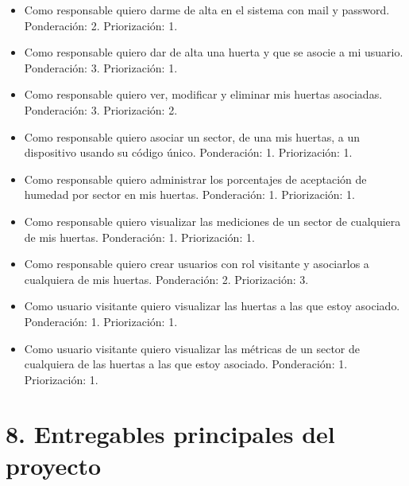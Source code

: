 \documentclass[
11pt, %
codirector, %
]{charter}
\begin{document}
\begin{itemize}
	\item Como responsable quiero darme de alta en el sistema con mail y password.
	\newline Ponderación: 2.
	\newline Priorización: 1.
	\item Como responsable quiero dar de alta una huerta y que se asocie a mi usuario.
	\newline Ponderación: 3.
	\newline Priorización: 1.
	\item Como responsable quiero ver, modificar y eliminar mis huertas asociadas.
	\newline Ponderación: 3.
	\newline Priorización: 2.
	\item Como responsable quiero asociar un sector, de una mis huertas, a un dispositivo usando su código único.
	\newline Ponderación: 1.
	\newline Priorización: 1.
	\item Como responsable quiero administrar los porcentajes de aceptación de humedad por sector en mis huertas.
	\newline Ponderación: 1.
	\newline Priorización: 1.
	\item Como responsable quiero visualizar las mediciones de un sector de cualquiera de mis huertas.
	\newline Ponderación: 1.
	\newline Priorización: 1.
	\item Como responsable quiero crear usuarios con rol visitante y asociarlos a cualquiera de mis huertas.
	\newline Ponderación: 2.
	\newline Priorización: 3.
	
	\item Como usuario visitante quiero visualizar las huertas a las que estoy asociado.
	\newline Ponderación: 1.
	\newline Priorización: 1.
	\item Como usuario visitante quiero visualizar las métricas de un sector de cualquiera de las huertas a las que estoy asociado.
	\newline Ponderación: 1.
	\newline Priorización: 1.
\end{itemize}


\section{8. Entregables principales del proyecto}
\label{sec:entregables}
\end{document}
